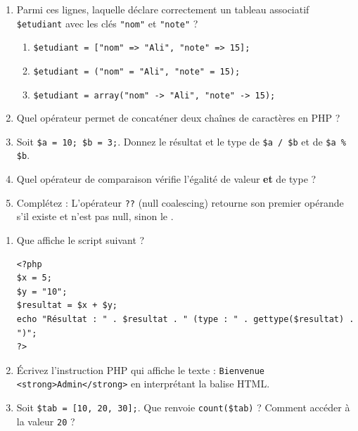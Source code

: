 \documentclass[11pt]{article}
\begin{document}
\begin{exercice}
\begin{enumerate}
    \item Parmi ces lignes, laquelle déclare correctement un tableau associatif \texttt{\$etudiant} avec les clés \texttt{"nom"} et \texttt{"note"} ?
    \begin{enumerate}
        \item \texttt{\$etudiant = ["nom" => "Ali", "note" => 15];}
        \item \texttt{\$etudiant = ("nom" = "Ali", "note" = 15);}
        \item \texttt{\$etudiant = array("nom" -> "Ali", "note" -> 15);}
    \end{enumerate}
    \item Quel opérateur permet de concaténer deux chaînes de caractères en PHP ?
    \item Soit \texttt{\$a = 10; \$b = 3;}. Donnez le résultat et le type de \texttt{\$a / \$b} et de \texttt{\$a \% \$b}.
    \item Quel opérateur de comparaison vérifie l'égalité de valeur \textbf{et} de type ?
    \item Complétez : L'opérateur \texttt{??} (null coalescing) retourne son premier opérande s'il existe et n'est pas null, sinon le \underline{\hspace{4cm}}.
\end{enumerate}
\end{exercice}

\begin{exercice}
\begin{enumerate}
    \item Que affiche le script suivant ?
\begin{verbatim}
<?php
$x = 5;
$y = "10";
$resultat = $x + $y;
echo "Résultat : " . $resultat . " (type : " . gettype($resultat) . ")";
?>
\end{verbatim}
    \item Écrivez l'instruction PHP qui affiche le texte : \texttt{Bienvenue <strong>Admin</strong>} en interprétant la balise HTML.
    \item Soit \texttt{\$tab = [10, 20, 30];}. Que renvoie \texttt{count(\$tab)} ? Comment accéder à la valeur \texttt{20} ?
\end{enumerate}
\end{exercice}
\end{document}
